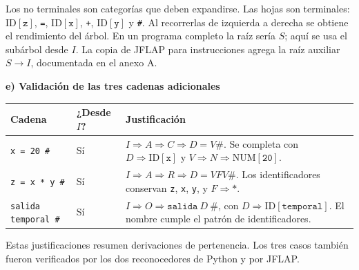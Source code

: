 \documentclass[11pt,letterpaper]{article}
\newcommand{\cod}[1]{\texttt{#1}}
\newcommand{\subtitulo}[1]{\vspace{5pt}\textbf{#1}\par\nopagebreak[4]}
\newcommand{\cab}[1]{\rowcolor{cabecera}#1}
\newcommand{\ID}[1]{\ensuremath{\mathrm{ID}[\texttt{#1}]}}
\newcommand{\NUM}[1]{\ensuremath{\mathrm{NUM}[\texttt{#1}]}}
\begin{document}
Los no terminales son categorías que deben expandirse. Las hojas son terminales: \ID{z}, \cod{=}, \ID{x}, \cod{+}, \ID{y} y \cod{\#}. Al recorrerlas de izquierda a derecha se obtiene el rendimiento del árbol. En un programa completo la raíz sería $S$; aquí se usa el subárbol desde $I$. La copia de JFLAP para instrucciones agrega la raíz auxiliar $S\to I$, documentada en el anexo A.

\subtitulo{e) Validación de las tres cadenas adicionales}
\begin{tabularx}{\textwidth}{|p{3.4cm}|p{1.5cm}|X|}\hline
\cab{\textbf{Cadena}&\textbf{¿Desde $I$?}&\textbf{Justificación}}\\\hline
\cod{x = 20 \#}&Sí&$I\Rightarrow A\Rightarrow C\Rightarrow D=V\#$. Se completa con $D\Rightarrow\ID{x}$ y $V\Rightarrow N\Rightarrow\NUM{20}$.\\\hline
\cod{z = x * y \#}&Sí&$I\Rightarrow A\Rightarrow R\Rightarrow D=VFV\#$. Los identificadores conservan \cod{z}, \cod{x}, \cod{y}, y $F\Rightarrow\cod{*}$.\\\hline
\cod{salida temporal \#}&Sí&$I\Rightarrow O\Rightarrow\cod{salida}\ D\ \#$, con $D\Rightarrow\ID{temporal}$. El nombre cumple el patrón de identificadores.\\\hline
\end{tabularx}
Estas justificaciones resumen derivaciones de pertenencia. Los tres casos también fueron verificados por los dos reconocedores de Python y por JFLAP.

\newpage
\end{document}
